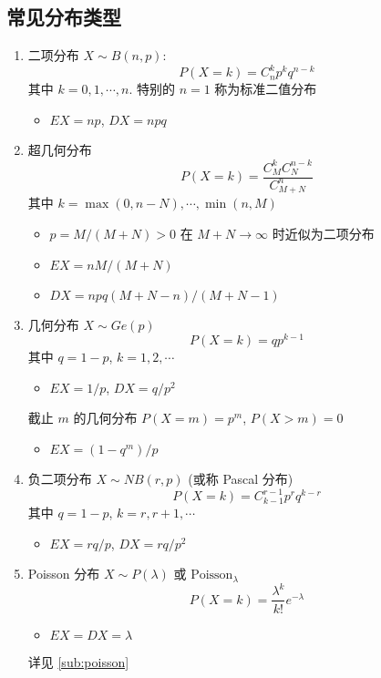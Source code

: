 \documentclass[11pt,a4paper,twocolumn]{article} %
\numberwithin{equation}{section} %
\begin{document}
\subsection{常见分布类型} %
\label{sub:dist_type_discret}
\begin{enumerate}
	\item 二项分布 $X\sim B(n, p)$: 
	\begin{equation}
		P(X=k) = C_n^k p^k q^{n-k}
	\end{equation}
	其中 $k = 0, 1, \cdots ,n$. 特别的 $n=1$ 称为标准二值分布
	\begin{itemize}
		\item $EX = np$, $DX = npq$
	\end{itemize}
	\item 超几何分布
	\begin{equation}
		P(X=k) = \frac{C_M^k C_N^{n-k}}{C_{M+N}^n}
	\end{equation}
	其中 $k = \max(0, n-N), \cdots, \min(n, M)$
	\begin{itemize}
		\item $p = M/(M+N) > 0$ 在 $M+N \to \infty$ 时近似为二项分布
		\item $EX = nM/(M+N)$
		\item $DX = npq(M+N-n)/(M+N-1)$
	\end{itemize}
	\item 几何分布 $X\sim Ge(p)$
	\begin{equation}
		P(X=k) = qp^{k-1}
	\end{equation}
	其中 $q = 1-p$, $k = 1, 2, \cdots$
	\begin{itemize}
		\item $EX = 1/p$, $DX = q/p^2$
	\end{itemize}
	截止 $m$ 的几何分布 $P(X=m) = p^m$, $P(X>m)=0$
	\begin{itemize}
		\item $EX = (1-q^m)/p$
	\end{itemize}
	\item 负二项分布 $X\sim N\!B(r, p)$ (或称 Pascal 分布)
	\begin{equation}
		P(X=k) = C_{k-1}^{r-1} p^r q^{k-r}
	\end{equation}
	其中 $q = 1-p$, $k = r, r+1, \cdots$
	\begin{itemize}
		\item $EX = rq/p$, $DX = rq/p^2$
	\end{itemize}
	\item Poisson 分布 $X\sim P(\lambda)$ 或 $\mbox{Poisson}_\lambda$
	\begin{equation}
		P(X=k) = \frac{\lambda^k}{k!}e^{-\lambda}
	\end{equation}
	\begin{itemize}
		\item $EX = DX = \lambda$
	\end{itemize}
	详见 \ref{sub:poisson}
\end{enumerate}
\end{document}
